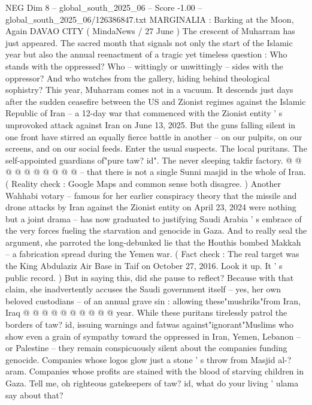\begin{textsample}{NEG Dim 8 – global\_south\_2025\_06 – Score -1.00 – global\_south\_2025\_06/126386847.txt}  \label{ex:f8_neg_257}
MARGINALIA : Barking at the Moon, Again DAVAO CITY ( MindaNews / 27 June ) The crescent of Muharram has just appeared.
The sacred month that signals not only the start of the Islamic year but also the annual reenactment of a tragic yet timeless question : Who stands with the oppressed?
Who -- wittingly or unwittingly -- sides with the oppressor?
And who watches from the gallery, hiding behind theological sophistry?
This year, Muharram comes not in a vacuum.
It descends just days after the sudden ceasefire between the US and Zionist regimes against the Islamic Republic of Iran -- a 12-day war that commenced with the Zionist entity ' s unprovoked attack against Iran on June 13, 2025.
But the guns falling silent in one front have stirred an equally fierce battle in another -- on our pulpits, on our screens, and on our social feeds.
Enter the usual suspects.
The local puritans.
The self-appointed guardians of"pure taw? id".
The never sleeping takfir factory. @ @ @ @ @ @ @ @ @ @ -- that there is not a single Sunni masjid in the whole of Iran. ( Reality check : Google Maps and common sense both disagree. ) Another Wahhabi votary -- famous for her earlier conspiracy theory that the missile and drone attacks by Iran against the Zionist entity on April 23, 2024 were nothing but a joint drama -- has now graduated to justifying Saudi Arabia ' s embrace of the very forces fueling the starvation and genocide in Gaza.
And to really seal the argument, she parroted the long-debunked lie that the Houthis bombed Makkah -- a fabrication spread during the Yemen war. ( Fact check : The real target was the King Abdulaziz Air Base in Taif on October 27, 2016.
Look it up.
It ' s public record. ) But in saying this, did she pause to reflect?
Because with that claim, she inadvertently accuses the Saudi government itself -- yes, her own beloved custodians -- of an annual grave sin : allowing these"mushriks"from Iran, Iraq @ @ @ @ @ @ @ @ @ @ year.
While these puritans tirelessly patrol the borders of taw? id, issuing warnings and fatwas against"ignorant"Muslims who show even a grain of sympathy toward the oppressed in Iran, Yemen, Lebanon -- or Palestine -- they remain conspicuously silent about the companies funding genocide.
Companies whose logos glow just a stone ' s throw from Masjid al-? aram.
Companies whose profits are stained with the blood of starving children in Gaza.
Tell me, oh righteous gatekeepers of taw? id, what do your living ' ulama say about that?

\end{textsample}
